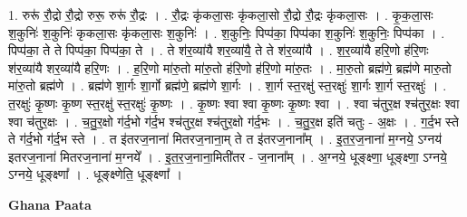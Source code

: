 \documentclass[17pt]{extarticle}
\begin{document}
1. रुरू॑ रौ॒द्रो रौ॒द्रो रुरू॒ रुरू॑ रौ॒द्रः । . रौ॒द्रः कृ॑कला॒सः कृ॑कला॒सो रौ॒द्रो रौ॒द्रः कृ॑कला॒सः । . कृ॒क॒ला॒सः श॒कुनिः॑ श॒कुनिः॑ कृकला॒सः कृ॑कला॒सः श॒कुनिः॑ । . श॒कुनिः॒ पिप्प॑का॒ पिप्प॑का श॒कुनिः॑ श॒कुनिः॒ पिप्प॑का । . पिप्प॑का॒ ते ते पिप्प॑का॒ पिप्प॑का॒ ते । . ते श॑र॒व्या॑यै शर॒व्या॑यै॒ ते ते श॑र॒व्या॑यै । . श॒र॒व्या॑यै हरि॒णो ह॑रि॒णः श॑र॒व्या॑यै शर॒व्या॑यै हरि॒णः । . ह॒रि॒णो मा॑रु॒तो मा॑रु॒तो ह॑रि॒णो ह॑रि॒णो मा॑रु॒तः । . मा॒रु॒तो ब्रह्म॑णे॒ ब्रह्म॑णे मारु॒तो मा॑रु॒तो ब्रह्म॑णे । . ब्रह्म॑णे शा॒र्गः शा॒र्गो ब्रह्म॑णे॒ ब्रह्म॑णे शा॒र्गः । . शा॒र्ग स्त॒रक्षु॑ स्त॒रक्षुः॑ शा॒र्गः शा॒र्ग स्त॒रक्षुः॑ । . त॒रक्षुः॑ कृ॒ष्णः कृ॒ष्ण स्त॒रक्षु॑ स्त॒रक्षुः॑ कृ॒ष्णः । . कृ॒ष्णः श्वा श्वा कृ॒ष्णः कृ॒ष्णः श्वा । . श्वा च॑तुर॒क्ष श्च॑तुर॒क्षः श्वा श्वा च॑तुर॒क्षः । . च॒तु॒र॒क्षो ग॑र्द॒भो ग॑र्द॒भ श्च॑तुर॒क्ष श्च॑तुर॒क्षो ग॑र्द॒भः । . च॒तु॒र॒क्ष इति॑ चतुः - अ॒क्षः । . ग॒र्द॒भ स्ते ते ग॑र्द॒भो ग॑र्द॒भ स्ते । . त इ॑तरज॒नाना॑ मितरज॒नाना॒म् ते त इ॑तरज॒नाना᳚म् । . इ॒त॒र॒ज॒नाना॑ म॒ग्नये॒ ऽग्नय॑ इतरज॒नाना॑ मितरज॒नाना॑ म॒ग्नये᳚ । . इ॒त॒र॒ज॒नाना॒मिती॑तर - ज॒नाना᳚म् । . अ॒ग्नये॒ धूङ्क्ष्णा॒ धूङ्क्ष्णा॒ ऽग्नये॒ ऽग्नये॒ धूङ्क्ष्णा᳚ । . धूङ्‍क्ष्णेति॒ धूङ्‍क्ष्णा᳚ । \newline

\textbf{Ghana Paata } \newline
\end{document}

